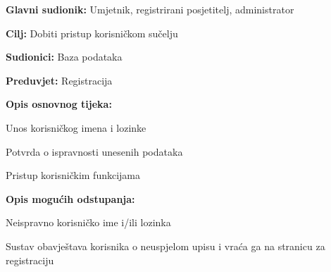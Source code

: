					\noindent {}
					\begin{packed_item}
						
						\item \textbf{Glavni sudionik: } Umjetnik, registrirani posjetitelj, administrator
						\item  \textbf{Cilj:}  Dobiti pristup korisničkom sučelju
						\item  \textbf{Sudionici:}  Baza podataka
						\item  \textbf{Preduvjet:}  Registracija
						\item  \textbf{Opis osnovnog tijeka:}
						
						\item[] \begin{packed_enum}
							
							\item  Unos korisničkog imena i lozinke
							\item  Potvrda o ispravnosti unesenih podataka
							\item  Pristup korisničkim funkcijama
						\end{packed_enum}
						
						\item  \textbf{Opis mogućih odstupanja:}
						
						\item[] \begin{packed_item}
							
							\item[2.a]  Neispravno korisničko ime i/ili lozinka
							\item[] \begin{packed_enum}
								
								\item  Sustav obavještava korisnika o neuspjelom upisu i 
								vraća ga na stranicu za registraciju
								
							\end{packed_enum}							
							
						\end{packed_item}
					\end{packed_item}
					
